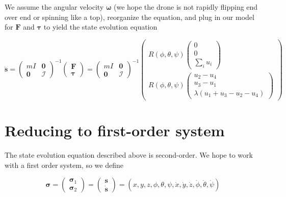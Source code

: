\documentclass{article}
\begin{document}
We assume the angular velocity $\bm{\omega}$ (we hope the drone is not rapidly flipping end over end or spinning like a top), reorganize the equation, and plug in our model for $\bm{F}$ and $\bm{\tau}$ to yield the state evolution equation

\begin{equation}
\ddot{\mathbf{s}} = 
\begin{pmatrix}
    m I & \mathbf{0} \\
    \mathbf{0} & \mathcal{I}
\end{pmatrix}^{-1}
\begin{pmatrix}
    \bm{F} \\
    \bm{\tau}
\end{pmatrix}
= \begin{pmatrix}
    m I & \mathbf{0} \\
    \mathbf{0} & \mathcal{I}
\end{pmatrix}^{-1}
\begin{pmatrix}
    R(\phi, \theta, \psi) \begin{pmatrix} 
        0 \\ 
        0 \\ 
        \sum_{i} u_i
    \end{pmatrix} \\
    R(\phi, \theta, \psi) \begin{pmatrix}
        u_2 - u_4 \\ 
        u_3 - u_1 \\ 
        \lambda(u_1 + u_3 - u_2 - u_4) 
    \end{pmatrix}
\end{pmatrix}
\label{eq:SecondOrderState}
\end{equation}

\section*{Reducing to first-order system}

The state evolution equation described above is second-order. We hope to work with a first order system, so we define

$$
\bm{\sigma} 
= \begin{pmatrix} \bm{\sigma}_1 \\ \bm{\sigma}_2 \end{pmatrix}
= \begin{pmatrix} \bm{s} \\ \dot{\bm{s}} \end{pmatrix}
= (x, y, z, \phi, \theta, \psi, \dot{x}, \dot{y}, \dot{z}, \dot{\phi}, \dot{\theta}, \dot{\psi})
$$
\end{document}
